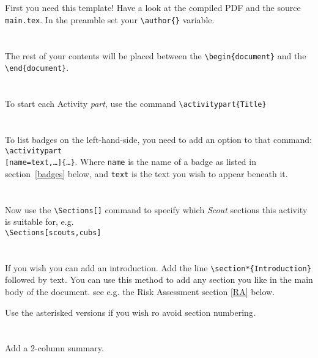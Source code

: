 \documentclass[a4paper]{GreyWolfsScoutActivityTemplate}
\begin{document}
\begin{ActivityProcedure}
\section{}
First you need this template! Have a look at the compiled PDF and the source {\tt main.tex}. 
In the preamble set your {\tt \textbackslash{}author\{\}} variable. 
\section{}
The rest of your contents will be placed between the {\tt \textbackslash{}begin\{document\}} and the {\tt \textbackslash{}end\{document\}}.
\section{}
To start each Activity \textit{part}, use the command {\tt \small{\textbackslash{}activitypart\{Title\}}}
\section{}
To list badges on the left-hand-side, you need to add an option to that command:\\ {\tt \small{\textbackslash{}activitypart\\\hspace*{5mm}[name=text,\ldots]\{\ldots\}}}. Where {\tt name} is the name of a badge as listed in section~\ref{badges} below, and {\tt text} is the text you wish to appear beneath it.
\section{}
Now use the {\tt \textbackslash{}Sections[]} command to specify which \textit{\color{ScoutPurple} Scout} sections this activity is suitable for, e.g.\\{\tt \small{\textbackslash{}Sections[scouts,cubs]}}
\section{}
If you wish you can add an introduction. Add the line {\tt \textbackslash{}section*\{Introduction\}} followed by text. You can use this method to add any section you like in the main body of the document. see e.g. the Risk Assessment section \ref{RA} below.

Use the asterisked versions if you wish ro avoid section numbering.
\section{}
Add a 2-column summary.


\end{ActivityProcedure}
\end{document}
